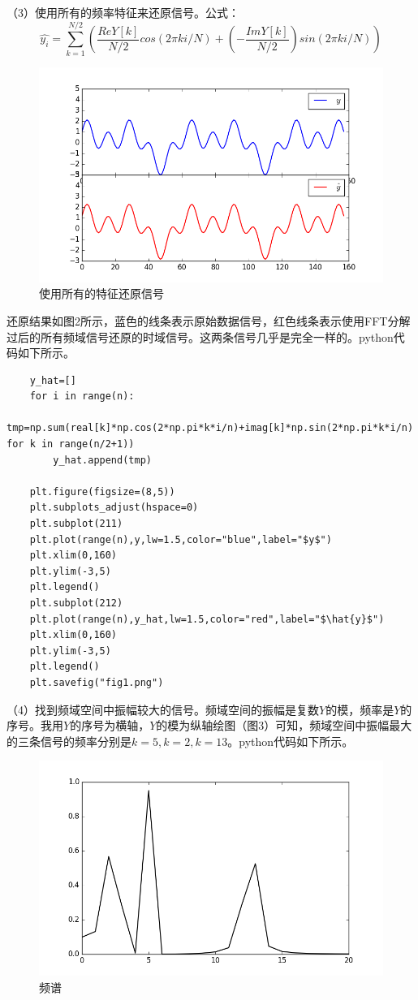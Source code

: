 \documentclass[12pt,a4paper,onecolumn]{article}
\begin{document}
（3）使用所有的频率特征来还原信号。公式：$$\hat{y_i}=\sum_{k=1}^{N/2}(\frac{ReY[k]}{N/2}cos(2\pi ki/N)+(-\frac{ImY[k]}{N/2})sin(2\pi ki/N))$$

\begin{figure}[H]
	\centering
	\includegraphics[width=400pt]{fig1.png}
	\caption{使用所有的特征还原信号}
\end{figure}

还原结果如图2所示，蓝色的线条表示原始数据信号，红色线条表示使用FFT分解过后的所有频域信号还原的时域信号。这两条信号几乎是完全一样的。python代码如下所示。

\begin{lstlisting}
	y_hat=[]
	for i in range(n):
	    tmp=np.sum(real[k]*np.cos(2*np.pi*k*i/n)+imag[k]*np.sin(2*np.pi*k*i/n) for k in range(n/2+1))
	    y_hat.append(tmp)

	plt.figure(figsize=(8,5))
	plt.subplots_adjust(hspace=0)
	plt.subplot(211)
	plt.plot(range(n),y,lw=1.5,color="blue",label="$y$")
	plt.xlim(0,160)
	plt.ylim(-3,5)
	plt.legend()
	plt.subplot(212)
	plt.plot(range(n),y_hat,lw=1.5,color="red",label="$\hat{y}$")
	plt.xlim(0,160)
	plt.ylim(-3,5)
	plt.legend()
	plt.savefig("fig1.png")
\end{lstlisting}

（4）找到频域空间中振幅较大的信号。频域空间的振幅是复数$Y$的模，频率是$Y$的序号。我用$Y$的序号为横轴，$Y$的模为纵轴绘图（图3）可知，频域空间中振幅最大的三条信号的频率分别是$k=5,k=2,k=13$。python代码如下所示。

\begin{figure}[H]
	\centering
	\includegraphics[width=400pt]{fig2.png}
	\caption{频谱}
\end{figure}
\end{document}
